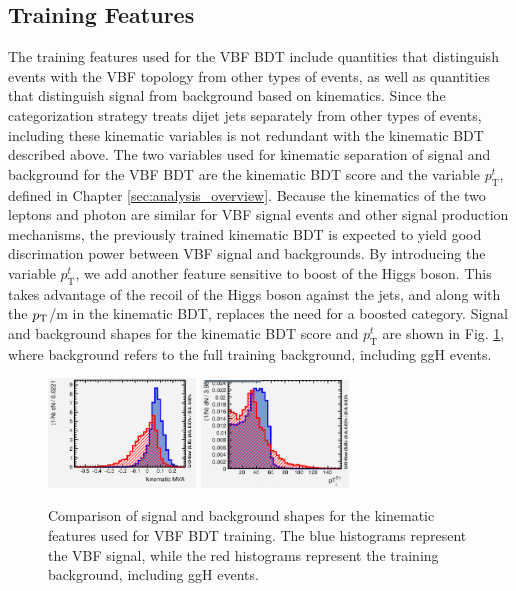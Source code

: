 \subsection{Training Features}
The training features used for the VBF BDT include quantities that distinguish events with the VBF topology from other types of events, as well as quantities that 
distinguish signal from background based on kinematics. Since the categorization strategy treats dijet jets separately from other types of events, including these 
kinematic variables is not redundant with the kinematic BDT described above. The two variables used for kinematic separation of signal and background for the VBF BDT are 
the kinematic BDT score and the variable $p_{\mathrm{T}}^{t}$, defined in Chapter \ref{sec:analysis_overview}. Because the kinematics of the two leptons and photon are 
similar for VBF signal events and other signal production mechanisms, the previously trained kinematic BDT is expected to yield good discrimation power between VBF signal and backgrounds. 
By introducing the variable $p_{\mathrm{T}}^{t}$, we add another feature sensitive to boost of the Higgs boson. This takes advantage of the recoil of the Higgs boson against the jets, and along 
with the $p_{\mathrm{T}}$/m in the kinematic BDT, replaces the need for a boosted category. Signal and background shapes for the kinematic BDT score and $p_{\mathrm{T}}^{t}$ are shown in Fig. 
\ref{fig:kin_bdt_ptt}, where background refers to the full training background, including ggH \hzg{} events.

\begin{figure}[tb]
	\begin{center}
		\includegraphics[width=0.35\textwidth]{fig/MVA/kin_bdt_vbf_training.png}
		\includegraphics[width=0.35\textwidth]{fig/MVA/ptt_vbf_training.png}
	\end{center}
	\caption{Comparison of signal and background shapes for the kinematic features used for VBF BDT training. The blue histograms represent the VBF signal, while the red histograms represent the training background, including ggH \hzg{} events.}
	\label{fig:kin_bdt_ptt}
\end{figure}

